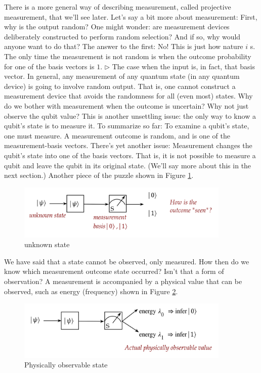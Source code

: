 \documentclass[main.tex]{subfiles}
\begin{document}
    There is a more general way of describing measurement, called projective measurement, that we'll see later. Let's say a bit more about measurement: First, why is the output random? One might wonder: are measurement devices deliberately constructed to perform random selection? And if so, why would anyone want to do that? The answer to the first: No! This is just how nature $i$ s. The only time the measurement is not random is when the outcome probability for one of the basis vectors is $1 .$ $\triangleright$ The case when the input is, in fact, that basis vector. In general, any measurement of any quantum state (in any quantum device) is going to involve random output. That is, one cannot construct a measurement device that avoids the randomness for all (even most) states. Why do we bother with measurement when the outcome is uncertain? Why not just observe the qubit value? This is another unsettling issue: the only way to know a qubit's state is to measure it. To summarize so far: To examine a qubit's state, one must measure. A measurement outcome is random, and is one of the measurement-basis vectors. There's yet another issue: Measurement changes the qubit's state into one of the basis vectors. That is, it is not possible to measure a qubit and leave the qubit in its original state. (We'll say more about this in the next section.) Another piece of the puzzle shown in Figure \ref{fig:12qubit5b}.
    
    \begin{figure}
        \centering
        \includegraphics[width=4in]{notes/figs/n05/12qubit5b.png}
        \caption{unknown state}
        \label{fig:12qubit5b}
    \end{figure}
    
    We have said that a state cannot be observed, only measured. How then do we know which measurement outcome state occurred? Isn't that a form of observation? A measurement is accompanied by a physical value that can be observed, such as energy (frequency) shown in Figure \ref{fig:13qubit5c}.
    
    \begin{figure}
        \centering
        \includegraphics[width=4in]{notes/figs/n05/13qubit5c.png}
        \caption{Physically observable state}
        \label{fig:13qubit5c}
    \end{figure}
    
\end{document}
